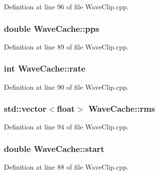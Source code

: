 Definition at line 96 of file Wave\+Clip.\+cpp.

\subsubsection[{\texorpdfstring{pps}{pps}}]{ double Wave\+Cache\+::pps}\hypertarget{class_wave_cache_a523eaf00e1e99a48767664d38405b68f}{}\label{class_wave_cache_a523eaf00e1e99a48767664d38405b68f}


Definition at line 89 of file Wave\+Clip.\+cpp.

\subsubsection[{\texorpdfstring{rate}{rate}}]{ {\bf int} Wave\+Cache\+::rate}\hypertarget{class_wave_cache_ac48cb51744b60852d389473425c4192b}{}\label{class_wave_cache_ac48cb51744b60852d389473425c4192b}


Definition at line 90 of file Wave\+Clip.\+cpp.

\subsubsection[{\texorpdfstring{rms}{rms}}]{\setlength{\rightskip}{0pt plus 5cm}std\+::vector$<$float$>$ Wave\+Cache\+::rms}\hypertarget{class_wave_cache_aeb21938e68b6a79b79566f1a3320d8e3}{}\label{class_wave_cache_aeb21938e68b6a79b79566f1a3320d8e3}


Definition at line 94 of file Wave\+Clip.\+cpp.

\subsubsection[{\texorpdfstring{start}{start}}]{ double Wave\+Cache\+::start}\hypertarget{class_wave_cache_a1dd0d05d0ee3d2f5da2a22c5effcff84}{}\label{class_wave_cache_a1dd0d05d0ee3d2f5da2a22c5effcff84}


Definition at line 88 of file Wave\+Clip.\+cpp.

